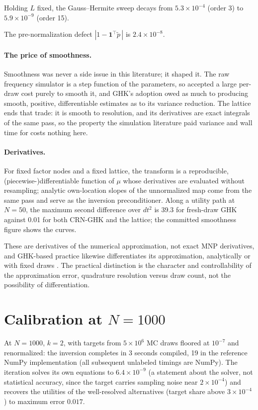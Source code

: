 \documentclass[12pt]{article}
\theoremstyle{remark}
\begin{document}
Holding $L$
fixed, the Gauss--Hermite sweep decays from $5.3\times10^{-4}$ (order 3) to
$5.9\times10^{-9}$ (order 15).

The pre-normalization defect
$|1 - \mathbf{1}^\top \tilde p\,|$ is $2.4\times10^{-8}$.

\paragraph{The price of smoothness.} Smoothness was never a side
issue in this literature; it shaped it. The raw frequency simulator is a
step function of the parameters, so \citet{stern1992} accepted a large
per-draw cost purely to smooth it, and GHK's adoption owed as much to
producing smooth, positive, differentiable estimates
\citep{hajivassiliou1998} as to its variance reduction. The lattice ends
that trade: it is smooth to resolution, and its derivatives are exact
integrals of the same pass, so the property the simulation literature
paid variance and wall time for costs nothing here.

\paragraph{Derivatives.} For fixed factor nodes and a fixed
lattice, the transform is a reproducible, (piecewise-)differentiable function
of $\mu$ whose derivatives are evaluated without resampling; analytic
own-location slopes of the unnormalized map come from the same pass and serve
as the inversion preconditioner. Along a utility path at $N=50$, the maximum second difference over $dt^2$
is 39.3 for fresh-draw GHK against 0.01 for both CRN-GHK and the lattice;
the committed smoothness figure shows the curves.

These are derivatives of the numerical
approximation, not exact MNP derivatives, and GHK-based practice likewise
differentiates its approximation, analytically or with fixed draws
\citep{hmr1996,hajivassiliou1998,train2009}. The practical distinction is the character and controllability of the
approximation error, quadrature resolution versus draw count, not the
possibility of differentiation.

\section{Calibration at $N=1000$}\label{sec:calibration}

At $N=1000$, $k=2$, with targets from
$5\times10^6$ MC draws floored at $10^{-7}$ and renormalized: the inversion
completes in 3 seconds compiled, 19 in the reference NumPy implementation
(all subsequent unlabeled timings are NumPy). The iteration solves its own equations to
$6.4\times10^{-9}$ (a statement about the solver, not statistical accuracy,
since the target carries sampling noise near $2\times10^{-4}$) and
recovers the utilities of the well-resolved alternatives (target share
above $3\times10^{-4}$) to maximum error $0.017$.
\end{document}
